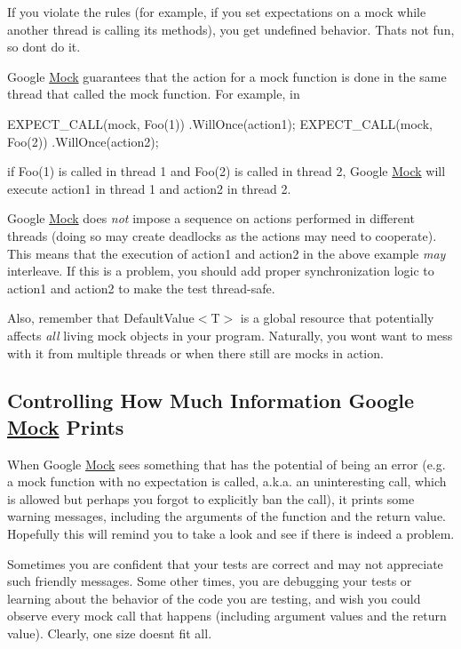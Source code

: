 If you violate the rules (for example, if you set expectations on a mock while another thread is calling its methods), you get undefined behavior. That\textquotesingle{}s not fun, so don\textquotesingle{}t do it.

Google \hyperlink{class_mock}{Mock} guarantees that the action for a mock function is done in the same thread that called the mock function. For example, in


\begin{DoxyCode}
EXPECT\_CALL(mock, Foo(1))
    .WillOnce(action1);
EXPECT\_CALL(mock, Foo(2))
    .WillOnce(action2);
\end{DoxyCode}


if {\ttfamily Foo(1)} is called in thread 1 and {\ttfamily Foo(2)} is called in thread 2, Google \hyperlink{class_mock}{Mock} will execute {\ttfamily action1} in thread 1 and {\ttfamily action2} in thread 2.

Google \hyperlink{class_mock}{Mock} does {\itshape not} impose a sequence on actions performed in different threads (doing so may create deadlocks as the actions may need to cooperate). This means that the execution of {\ttfamily action1} and {\ttfamily action2} in the above example {\itshape may} interleave. If this is a problem, you should add proper synchronization logic to {\ttfamily action1} and {\ttfamily action2} to make the test thread-\/safe.

Also, remember that {\ttfamily Default\+Value$<$T$>$} is a global resource that potentially affects {\itshape all} living mock objects in your program. Naturally, you won\textquotesingle{}t want to mess with it from multiple threads or when there still are mocks in action.

\subsection*{Controlling How Much Information Google \hyperlink{class_mock}{Mock} Prints}

When Google \hyperlink{class_mock}{Mock} sees something that has the potential of being an error (e.\+g. a mock function with no expectation is called, a.\+k.\+a. an uninteresting call, which is allowed but perhaps you forgot to explicitly ban the call), it prints some warning messages, including the arguments of the function and the return value. Hopefully this will remind you to take a look and see if there is indeed a problem.

Sometimes you are confident that your tests are correct and may not appreciate such friendly messages. Some other times, you are debugging your tests or learning about the behavior of the code you are testing, and wish you could observe every mock call that happens (including argument values and the return value). Clearly, one size doesn\textquotesingle{}t fit all.

